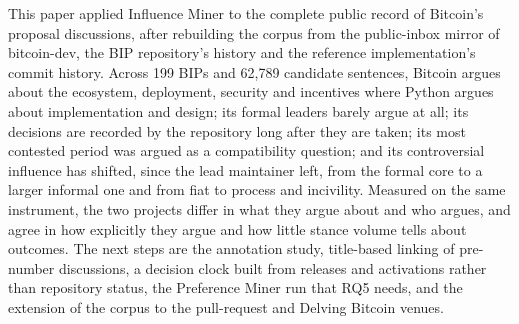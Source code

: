 This paper applied Influence Miner to the complete public record of Bitcoin's proposal discussions, after rebuilding the corpus from the public-inbox mirror of bitcoin-dev, the BIP repository's history and the reference implementation's commit history. Across 199 BIPs and 62,789 candidate sentences, Bitcoin argues about the ecosystem, deployment, security and incentives where Python argues about implementation and design; its formal leaders barely argue at all; its decisions are recorded by the repository long after they are taken; its most contested period was argued as a compatibility question; and its controversial influence has shifted, since the lead maintainer left, from the formal core to a larger informal one and from fiat to process and incivility. Measured on the same instrument, the two projects differ in what they argue about and who argues, and agree in how explicitly they argue and how little stance volume tells about outcomes. The next steps are the annotation study, title-based linking of pre-number discussions, a decision clock built from releases and activations rather than repository status, the Preference Miner run that RQ5 needs, and the extension of the corpus to the pull-request and Delving Bitcoin venues.

